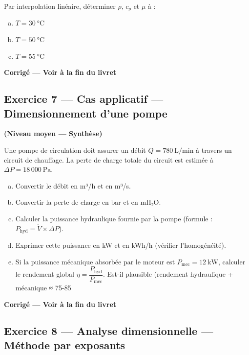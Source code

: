 Par interpolation linéaire, déterminer $\rho$, $c_p$ et $\mu$ à :

\begin{enumerate}[a)]
  \item $T = 30~\mathrm{°C}$

  \item $T = 50~\mathrm{°C}$

  \item $T = 55~\mathrm{°C}$
\end{enumerate}

\textbf{Corrigé — Voir à la fin du livret}

\subsection*{Exercice 7 — Cas applicatif — Dimensionnement d'une pompe}

\textbf{(Niveau moyen — Synthèse)}

Une pompe de circulation doit assurer un débit $Q = 780~\mathrm{L/min}$ à travers un circuit de
chauffage. La perte de charge totale du circuit est estimée à $\Delta P = 18\,000~\mathrm{Pa}$.

\begin{enumerate}[a)]
  \item Convertir le débit en m³/h et en m³/s.

  \item Convertir la perte de charge en bar et en mH₂O.

  \item Calculer la puissance hydraulique fournie par la pompe (formule : $P_{\text{hyd}} = \dot{V} \times 
        \Delta P$).

  \item Exprimer cette puissance en kW et en kWh/h (vérifier l'homogénéité).

  \item Si la puissance mécanique absorbée par le moteur est $P_{\text{mec}} = 12~\mathrm{kW}$, calculer le
        rendement global $\eta = \dfrac{P_{\text{hyd}}}{P_{\text{mec}}}$. Est-il plausible (rendement
        hydraulique + mécanique ≈ 75-85\,%
\end{enumerate}

\textbf{Corrigé — Voir à la fin du livret}

\subsection*{Exercice 8 — Analyse dimensionnelle — Méthode par exposants}

